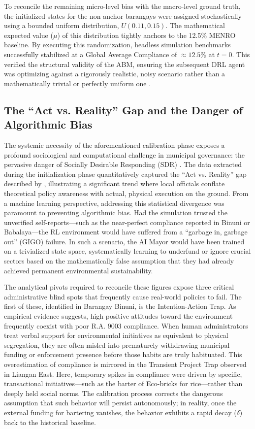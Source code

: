 To reconcile the remaining micro-level bias with the macro-level ground truth, the initialized states for the non-anchor barangays were assigned stochastically using a bounded uniform distribution, $U(0.11, 0.15)$. The mathematical expected value ($\mu$) of this distribution tightly anchors to the 12.5\% MENRO baseline. By executing this randomization, headless simulation benchmarks successfully stabilized at a Global Average Compliance of $\approx 12.5\%$ at $t = 0$. This verified the structural validity of the ABM, ensuring the subsequent DRL agent was optimizing against a rigorously realistic, noisy scenario rather than a mathematically trivial or perfectly uniform one \citep{McCulloch2022}.

\subsection{The ``Act vs. Reality'' Gap and the Danger of Algorithmic Bias}
The systemic necessity of the aforementioned calibration phase exposes a profound sociological and computational challenge in municipal governance: the pervasive danger of Socially Desirable Responding (SDR) \citep{Geiger2021}. The data extracted during the initialization phase quantitatively captured the ``Act vs. Reality'' gap described by \cite{Yazawa2025}, illustrating a significant trend where local officials conflate theoretical policy awareness with actual, physical execution on the ground. From a machine learning perspective, addressing this statistical divergence was paramount to preventing algorithmic bias. Had the simulation trusted the unverified self-reports—such as the near-perfect compliance reported in Binuni or Babalaya—the RL environment would have suffered from a ``garbage in, garbage out'' (GIGO) failure. In such a scenario, the AI Mayor would have been trained on a trivialized state space, systematically learning to underfund or ignore crucial sectors based on the mathematically false assumption that they had already achieved permanent environmental sustainability.

The analytical pivots required to reconcile these figures expose three critical administrative blind spots that frequently cause real-world policies to fail. The first of these, identified in Barangay Binuni, is the Intention-Action Trap. As empirical evidence suggests, high positive attitudes toward the environment frequently coexist with poor R.A. 9003 compliance. When human administrators treat verbal support for environmental initiatives as equivalent to physical segregation, they are often misled into prematurely withdrawing municipal funding or enforcement presence before those habits are truly habituated. This overestimation of compliance is mirrored in the Transient Project Trap observed in Liangan East. Here, temporary spikes in compliance were driven by specific, transactional initiatives—such as the barter of Eco-bricks for rice—rather than deeply held social norms. The calibration process corrects the dangerous assumption that such behavior will persist autonomously; in reality, once the external funding for bartering vanishes, the behavior exhibits a rapid decay ($\delta$) back to the historical baseline.

